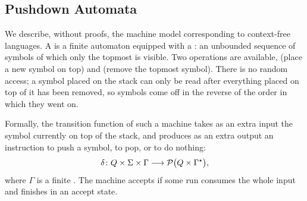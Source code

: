 \documentclass[a4paper]{scrartcl}
\begin{document}
\subsection{Pushdown Automata}

We describe, without proofs, the machine model corresponding to context-free languages. A  is a finite automaton equipped with a : an unbounded sequence of symbols of which only the topmost is visible. Two operations are available,  (place a new symbol on top) and  (remove the topmost symbol). There is no random access; a symbol placed on the stack can only be read after everything placed on top of it has been removed, so symbols come off in the reverse of the order in which they went on.

\begin{center}
\end{center}

Formally, the transition function of such a machine takes as an extra input the symbol currently on top of the stack, and produces as an extra output an instruction to push a symbol, to pop, or to do nothing:
$$\delta \colon Q \times \Sigma \times \Gamma \longrightarrow \mathcal{P}\big(Q \times \Gamma^\star\big),$$
where $\Gamma$ is a finite . The machine accepts if some run consumes the whole input and finishes in an accept state.
\end{document}
